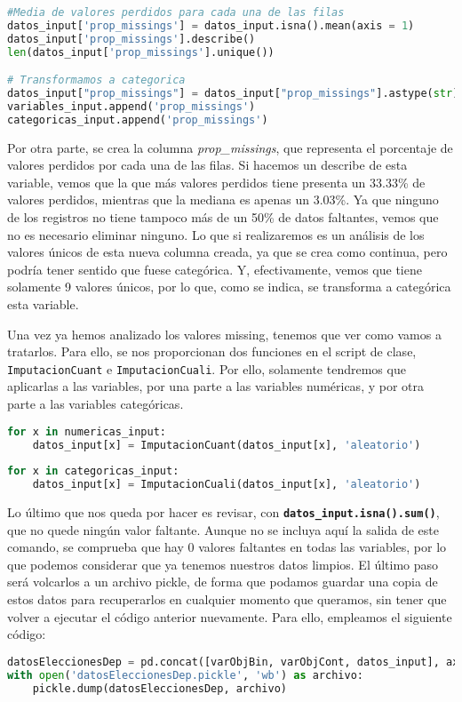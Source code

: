 \documentclass[a4paper,onecolumn]{extarticle}
\begin{document}
\begin{sloppypar}
\begin{lstlisting}[language=Python]
#Media de valores perdidos para cada una de las filas
datos_input['prop_missings'] = datos_input.isna().mean(axis = 1)
datos_input['prop_missings'].describe()
len(datos_input['prop_missings'].unique())

# Transformamos a categorica
datos_input["prop_missings"] = datos_input["prop_missings"].astype(str)
variables_input.append('prop_missings')
categoricas_input.append('prop_missings')
\end{lstlisting}

Por otra parte, se crea la columna \textit{prop\_missings}, que representa el porcentaje de valores perdidos por cada una de las filas. Si hacemos un describe 
de esta variable, vemos que la que más valores perdidos tiene presenta un 33.33\% de valores perdidos, mientras que la mediana es apenas un 3.03\%. Ya que 
ninguno de los registros no tiene tampoco más de un 50\% de datos faltantes, vemos que no es necesario eliminar ninguno. Lo que si realizaremos es un análisis 
de los valores únicos de esta nueva columna creada, ya que se crea como continua, pero podría tener sentido que fuese categórica. Y, efectivamente, vemos que 
tiene solamente 9 valores únicos, por lo que, como se indica, se transforma a categórica esta variable.

Una vez ya hemos analizado los valores missing, tenemos que ver como vamos a tratarlos. Para ello, se nos proporcionan dos funciones en el script de clase,
\texttt{ImputacionCuant} e \texttt{ImputacionCuali}. Por ello, solamente tendremos que aplicarlas a las variables, por una parte a las variables numéricas, 
y por otra parte a las variables categóricas.
\begin{lstlisting}[language=Python]
for x in numericas_input:
    datos_input[x] = ImputacionCuant(datos_input[x], 'aleatorio')
    
for x in categoricas_input:
    datos_input[x] = ImputacionCuali(datos_input[x], 'aleatorio')
\end{lstlisting}

Lo último que nos queda por hacer es revisar, con \texttt{\textbf{datos\_input.isna().sum()}}, que no quede ningún valor faltante. Aunque no se incluya aquí 
la salida de este comando, se comprueba que hay 0 valores faltantes en todas las variables, por lo que podemos considerar que ya tenemos nuestros datos limpios.
El último paso será volcarlos a un archivo pickle, de forma que podamos guardar una copia de estos datos para recuperarlos en cualquier momento que queramos, 
sin tener que volver a ejecutar el código anterior nuevamente. Para ello, empleamos el siguiente código:
\begin{lstlisting}[language=Python]
datosEleccionesDep = pd.concat([varObjBin, varObjCont, datos_input], axis = 1)
with open('datosEleccionesDep.pickle', 'wb') as archivo:
    pickle.dump(datosEleccionesDep, archivo)
\end{lstlisting}


\end{sloppypar}
\end{document}

